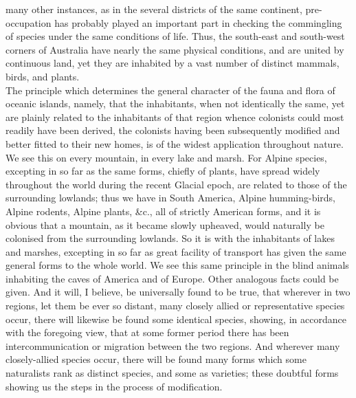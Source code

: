 many other instances, as in the several districts of the same continent, pre-occupation has probably played an important part in checking the commingling of species under the same conditions of life. Thus, the south-east and south-west corners of Australia have nearly the same physical conditions, and are united by continuous land, yet they are inhabited by a vast number of distinct mammals, birds, and plants.~\\
\indent The principle which determines the general character of the fauna and flora of oceanic islands, namely, that the inhabitants, when not identically the same, yet are plainly related to the inhabitants of that region whence colonists could most readily have been derived, the colonists having been subsequently modified and better fitted to their new homes, is of the widest application throughout nature. We see this on every mountain, in every lake and marsh. For Alpine species, excepting in so far as the same forms, chiefly of plants, have spread widely throughout the world during the recent Glacial epoch, are related to those of the surrounding lowlands; thus we have in South America, Alpine humming-birds, Alpine rodents, Alpine plants, \&c., all of strictly American forms, and it is obvious that a mountain, as it became slowly upheaved, would naturally be colonised from the surrounding lowlands.  So it is with the inhabitants of lakes and marshes, excepting in so far as great facility of transport has given the same general forms to the whole world. We see this same principle in the blind animals inhabiting the caves of America and of Europe. Other analogous facts could be given. And it will, I believe, be universally found to be true, that wherever in two regions, let them be ever so distant, many closely allied or representative species occur, there will likewise be found some identical species, showing, in accordance with the foregoing view, that at some former period there has been intercommunication or migration between the two regions.  And wherever many closely-allied species occur, there will be found many forms which some naturalists rank as distinct species, and some as varieties; these doubtful forms showing us the steps in the process of modification.~\\
